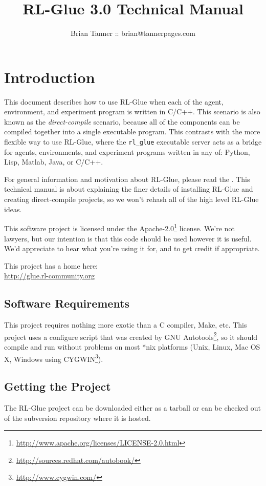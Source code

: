 \documentclass[11pt]{article}
\title{RL-Glue 3.0 Technical Manual }
\author{Brian Tanner :: brian@tannerpages.com}
\date{}
\begin{document}
\maketitle
\tableofcontents

\section{Introduction}

This document describes how to use RL-Glue when each of the agent, environment, and experiment program is written in C/C++.  This scenario is also known as the \textit{direct-compile} scenario, because all of the
components can be compiled together into a single executable program.  This contrasts with the more flexible way to use RL-Glue, where the \texttt{rl\_glue} executable server acts as a bridge for agents, environments, and experiment 
programs written in any of: Python, Lisp, Matlab, Java, or C/C++.  

For general information and motivation about RL-Glue, please read the .  This technical manual is about explaining the finer details of installing RL-Glue and creating direct-compile projects, 
so we won't rehash all of the high level RL-Glue ideas.

This software project is licensed under the Apache-2.0\footnote{\url{http://www.apache.org/licenses/LICENSE-2.0.html}} license. We're not lawyers, but our intention is that this code 
should be used however it is useful.  We'd appreciate to hear what you're using it for, and to get credit if appropriate.

This project has a home here:\\
\url{http://glue.rl-community.org}



\subsection{Software Requirements}
This project requires nothing more exotic than a C compiler, Make, etc.  This project uses a configure script that was created by GNU 
Autotools\footnote{\url{http://sources.redhat.com/autobook/}}, so it should compile and run without problems 
on most *nix platforms (Unix, Linux, Mac OS X, Windows using CYGWIN\footnote{\url{http://www.cygwin.com/}}). 

\subsection{Getting the Project}
The RL-Glue project can be downloaded either as a tarball or can be checked out of the subversion repository where it is hosted.
\end{document}
